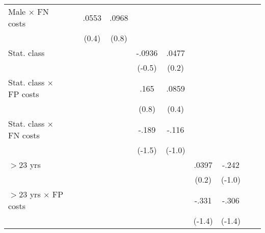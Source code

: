 \begin{table}[htbp]
\begin{tabular}{l*{9}{c}}
Male $\times$ FN costs&                  &    .0553         &    .0968         &                  &                  &                  &                  &                  &                  \\
                &                  &    (0.4)         &    (0.8)         &                  &                  &                  &                  &                  &                  \\
Stat. class     &                  &                  &                  &   -.0936         &    .0477         &                  &                  &                  &                  \\
                &                  &                  &                  &   (-0.5)         &    (0.2)         &                  &                  &                  &                  \\
Stat. class $\times$ FP costs&                  &                  &                  &     .165         &    .0859         &                  &                  &                  &                  \\
                &                  &                  &                  &    (0.8)         &    (0.4)         &                  &                  &                  &                  \\
Stat. class $\times$ FN costs&                  &                  &                  &    -.189         &    -.116         &                  &                  &                  &                  \\
                &                  &                  &                  &   (-1.5)         &   (-1.0)         &                  &                  &                  &                  \\
$>$23 yrs       &                  &                  &                  &                  &                  &    .0397         &    -.242         &                  &                  \\
                &                  &                  &                  &                  &                  &    (0.2)         &   (-1.0)         &                  &                  \\
$>$23 yrs $\times$ FP costs&                  &                  &                  &                  &                  &    -.331         &    -.306         &                  &                  \\
                &                  &                  &                  &                  &                  &   (-1.4)         &   (-1.4)         &                  &                  \\

\end{tabular}
\end{table}
